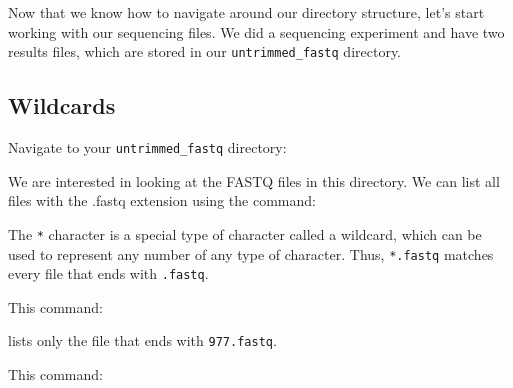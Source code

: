 \documentclass[
  letterpaper,
  DIV=11,
  numbers=noendperiod]{scrreprt}
\newenvironment{Shaded}{\begin{snugshade}}{\end{snugshade}}
\newcommand{\ExtensionTok}[1]{\textcolor[rgb]{0.00,0.23,0.31}{#1}}
\newcommand{\NormalTok}[1]{\textcolor[rgb]{0.00,0.23,0.31}{#1}}
\newcommand{\PreprocessorTok}[1]{\textcolor[rgb]{0.68,0.00,0.00}{#1}}
\begin{document}
Now that we know how to navigate around our directory structure, let's
start working with our sequencing files. We did a sequencing experiment
and have two results files, which are stored in our
\texttt{untrimmed\_fastq} directory.

\subsection{Wildcards}\label{wildcards}

Navigate to your \texttt{untrimmed\_fastq} directory:

\begin{Shaded}
\end{Shaded}

We are interested in looking at the FASTQ files in this directory. We
can list all files with the .fastq extension using the command:

\begin{Shaded}
\end{Shaded}

The \texttt{*} character is a special type of character called a
wildcard, which can be used to represent any number of any type of
character. Thus, \texttt{*.fastq} matches every file that ends with
\texttt{.fastq}.

This command:

\begin{Shaded}
\end{Shaded}

lists only the file that ends with \texttt{977.fastq}.

This command:

\begin{Shaded}
\end{Shaded}
\end{document}
